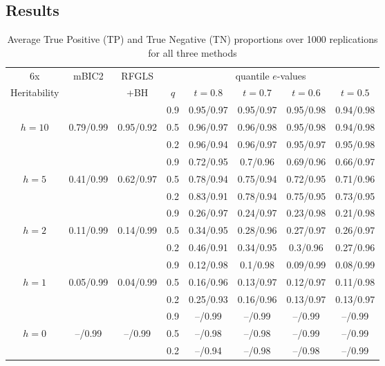 \subsection{Results}
\begin{table}
\begin{footnotesize}
\centering
    \begin{tabular}{c|c|c|c|cccc}
    \hline
     6x   & mBIC2       & RFGLS  & \multicolumn{5}{|c}{quantile $e$-values}    \\\cline{4-8}
    Heritability    &           & +BH		 & $q$    & $t=0.8$     & $t=0.7$     & $t=0.6$     & $t=0.5$     \\ \hline
    ~    & ~         & ~         & 0.9      & 0.95/0.97 & 0.95/0.97 & 0.95/0.98 & 0.94/0.98 \\
    $h=10$ & 0.79/0.99 & 0.95/0.92 & 0.5      & 0.96/0.97 & 0.96/0.98 & 0.95/0.98 & 0.94/0.98 \\
    ~    & ~         & ~         & 0.2      & 0.96/0.94 & 0.96/0.97 & 0.95/0.97 & 0.95/0.98 \\\hline
    ~    & ~         & ~         & 0.9      & 0.72/0.95 & 0.7/0.96  & 0.69/0.96 & 0.66/0.97 \\
    $h=5$  & 0.41/0.99 & 0.62/0.97 & 0.5      & 0.78/0.94 & 0.75/0.94 & 0.72/0.95 & 0.71/0.96 \\
    ~    & ~         & ~         & 0.2      & 0.83/0.91 & 0.78/0.94 & 0.75/0.95 & 0.73/0.95 \\\hline
    ~    & ~         & ~         & 0.9      & 0.26/0.97 & 0.24/0.97 & 0.23/0.98 & 0.21/0.98 \\
    $h=2$  & 0.11/0.99 & 0.14/0.99 & 0.5      & 0.34/0.95 & 0.28/0.96 & 0.27/0.97 & 0.26/0.97 \\
    ~    & ~         & ~         & 0.2      & 0.46/0.91 & 0.34/0.95 & 0.3/0.96  & 0.27/0.96 \\\hline
    ~    & ~         & ~         & 0.9      & 0.12/0.98 & 0.1/0.98  & 0.09/0.99 & 0.08/0.99 \\
    $h=1$  & 0.05/0.99 & 0.04/0.99    & 0.5      & 0.16/0.96 & 0.13/0.97 & 0.12/0.97 & 0.11/0.98 \\
    ~    & ~         & ~         & 0.2      & 0.25/0.93 & 0.16/0.96 & 0.13/0.97 & 0.13/0.97 \\\hline
    ~    & ~         & ~         & 0.9      & --/0.99 & --/0.99 & --/0.99 & --/0.99    \\
    $h=0$  & --/0.99 & --/0.99       & 0.5      & --/0.98 & --/0.98 & --/0.99 & --/0.99 \\
    ~    & ~         & ~         & 0.2      & --/0.94 & --/0.98 & --/0.98 & --/0.99 \\\hline
    \end{tabular}
    \caption{Average True Positive (TP) and True Negative (TN) proportions over 1000 replications for all three methods}
    \label{table:SNPSimTable0}
\end{footnotesize}
\end{table}

